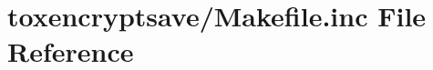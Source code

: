 \hypertarget{toxencryptsave_2_makefile_8inc}{\section{toxencryptsave/\+Makefile.inc File Reference}
\label{toxencryptsave_2_makefile_8inc}
}
